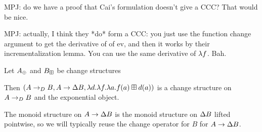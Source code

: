MPJ: do we have a proof that Cai's formulation doesn't give a CCC? That would be
nice.

MPJ: actually, I think they *do* form a CCC: you just use the function change
argument to get the derivative of of ev, and then it works by their
incrementalization lemma. You can use the same derivative of $\lambda f$. Bah.

\begin{prop}[Exponentials]
\label{prop:exponentials}
  Let $A_\oplus$ and $B_\boxplus$ be change structures

  Then $(A \rightarrow_{D} B,A
    \rightarrow \Delta B,\lambda d. \lambda f. \lambda a. f(a) \boxplus
    d(a))$ is a change structure on $A \rightarrow_{D} B$ and the exponential object.

  The monoid structure on $A \rightarrow \Delta B$ is the monoid
  structure on $\Delta B$ lifted pointwise, so we will typically reuse the
  change operator for $B$ for $A \rightarrow \Delta B$.
\end{prop}
